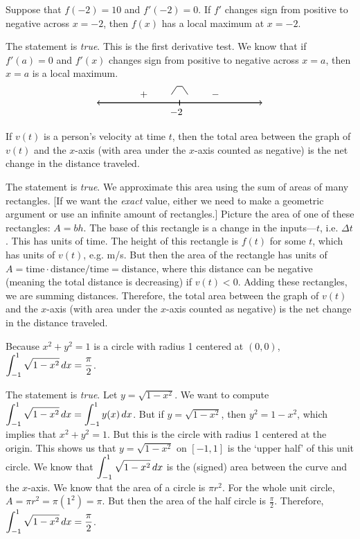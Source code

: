 \documentclass[11pt,letterpaper]{article}
\begin{document}
\newpage



 Suppose that $f(-2)= 10$ and $f'(-2)= 0$. If $f'$ changes sign from positive to negative across $x= -2$, then $f(x)$ has a local maximum at $x= -2$. \pspace

\sol The statement is \textit{true}. This is the first derivative test. We know that if $f'(a)= 0$ and $f'(x)$ changes sign from positive to negative across $x= a$, then $x= a$ is a local maximum. 
	\[
	\begin{tikzpicture}
	\draw[line width=0.03cm,<->] (-3,0) -- (3,0);
	\draw[line width=0.03cm] (0,-0.1) -- (0,0.1);
	\node at (-0.12,-0.35) {$-2$};
	\node at (-1.3,0.3) {$+$};
	\node at (1.3,0.3) {$-$};
	\draw[line width=0.02cm] (-0.3,0.3) -- (-0.1,0.6) -- (0.1,0.6) -- (0.3,0.3);
	\end{tikzpicture}
	\]





 If $v(t)$ is a person's velocity at time $t$, then the total area between the graph of $v(t)$ and the $x$-axis (with area under the $x$-axis counted as negative) is the net change in the distance traveled. \pspace

\sol The statement is \textit{true}. We approximate this area using the sum of areas of many rectangles. [If we want the \textit{exact} value, either we need to make a geometric argument or use an infinite amount of rectangles.] Picture the area of one of these rectangles: $A= bh$. The base of this rectangle is a change in the inputs---$t$, i.e. $\Delta t$. This has units of time. The height of this rectangle is $f(t)$ for some $t$, which has units of $v(t)$, e.g. m/s. But then the area of the rectangle has units of $A= \text{time} \cdot \text{distance/time}= \text{distance}$, where this distance can be negative (meaning the total distance is decreasing) if $v(t) < 0$. Adding these rectangles, we are summing distances. Therefore, the total area between the graph of $v(t)$ and the $x$-axis (with area under the $x$-axis counted as negative) is the net change in the distance traveled. \pvspace{1.3cm}



 Because $x^2 + y^2= 1$ is a circle with radius 1 centered at $(0, 0)$, $\displaystyle\int_{-1}^1 \sqrt{1 - x^2} \,dx= \frac{\pi}{2}$. \pspace

\sol The statement is \textit{true}. Let $y= \sqrt{1 - x^2}$. We want to compute $\displaystyle\int_{-1}^1 \sqrt{1 - x^2} \,dx= \int_{-1}^1 y(x) \,dx$. But if $y= \sqrt{1 - x^2}$, then $y^2= 1 - x^2$, which implies that $x^2 + y^2= 1$. But this is the circle with radius 1 centered at the origin. This shows us that $y= \sqrt{1 - x^2}$ on $[-1, 1]$ is the `upper half' of this unit circle. We know that $\displaystyle\int_{-1}^1 \sqrt{1 - x^2} \,dx$ is the (signed) area between the curve and the $x$-axis. We know that the area of a circle is $\pi r^2$. For the whole unit circle, $A= \pi r^2= \pi (1^2)= \pi$. But then the area of the half circle is $\frac{\pi}{2}$. Therefore, $\displaystyle\int_{-1}^1 \sqrt{1 - x^2} \,dx= \frac{\pi}{2}$. \pvspace{1.3cm}
\end{document}
